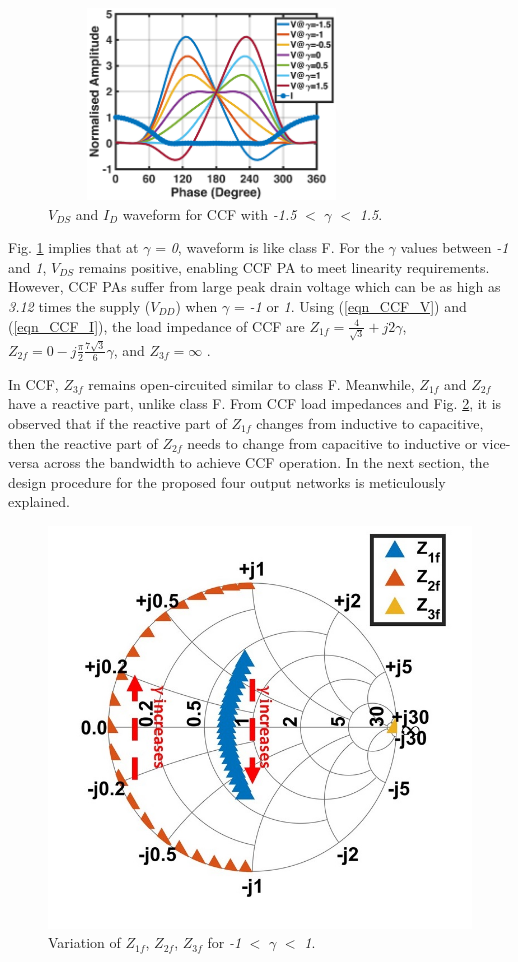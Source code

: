 \documentclass[conference]{IEEEtran}
\begin{document}
\begin{figure}[!t]
\centering
\captionsetup{font=footnotesize}
\includegraphics[width=3.4in, height=2in]{Images/CCF/CCF_wave_VI.pdf}
\caption{$V_{DS}$ and $I_D$ waveform for CCF with \textit{-1.5} $<$ $\gamma$ $<$ \textit{1.5}.}
\label{fig:CCF_wave_VI}
\vspace{-0.1in}
\end{figure}

Fig. \ref{fig:CCF_wave_VI} implies that at $\gamma$ = \textit{0}, waveform is like class F. For the $\gamma$ values between \textit{-1} and \textit{1}, $V_{DS}$ remains positive, enabling CCF PA to meet linearity requirements. However, CCF PAs suffer from large peak drain voltage which can be as high as \textit{3.12} times the supply ($V_{DD}$) when $\gamma$ = \textit{-1} or \textit{1}. Using (\ref{eqn_CCF_V}) and (\ref{eqn_CCF_I}), the load impedance of CCF  are $Z_{1f}=\frac{4}{\sqrt{3}}+j 2 \gamma$, $Z_{2f}=0-j \frac{\pi}{2} \frac{7 \sqrt{3}}{6} \gamma$, and $Z_{3f}=\infty$ \cite{CCFDesign_ali}.


In CCF, $Z_{3f}$ remains open-circuited similar to class F. Meanwhile, $Z_{1f}$ and $Z_{2f}$ have a reactive part, unlike class F. From CCF load impedances and Fig. \ref{fig:CCF_SC}, it is observed that if the reactive part of $Z_{1f}$ changes from inductive to capacitive, then the reactive part of $Z_{2f}$  needs to change from capacitive to inductive or vice-versa across the bandwidth to achieve CCF operation. In the next section, the design procedure for the proposed four output networks is meticulously explained. 

\begin{figure}[!t]
\centering
\captionsetup{font=footnotesize}
\includegraphics[width=0.63\linewidth]{Images/CCF/CCF_SC.jpg}
\caption{Variation of $Z_{1f}$, $Z_{2f}$, $Z_{3f}$ for \textit{-1} $<$ $\gamma$ $<$ \textit{1}.}
\label{fig:CCF_SC}
\vspace{-0.25in}
\end{figure}
 
\end{document}
